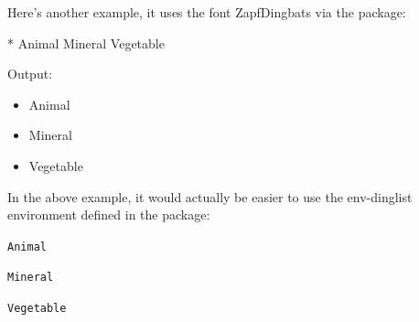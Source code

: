 Here's another example, it uses the 
font ZapfDingbats via the  package:
\begin{code}
*\newline
{}\newline
\mbox{}\newline
{} Animal\newline
\mbox{}\newline
{} Mineral\newline
\mbox{}\newline
{} Vegetable\newline
\mbox{}\newline
{}
\end{code}\bookpagebreak\noindent
Output:
\begin{result}
\renewcommand*{\labelitemi}{\ding{43}}

\begin{itemize}

\item Animal

\item Mineral

\item Vegetable

\end{itemize}
\end{result}%
In the above example, it would actually be easier to use the
\gls{env-dinglist} environment defined in the  package:
\begin{code}
\begin{alltt}

 Animal

 Mineral

 Vegetable\screenpagebreak

\end{alltt}
\end{code}



